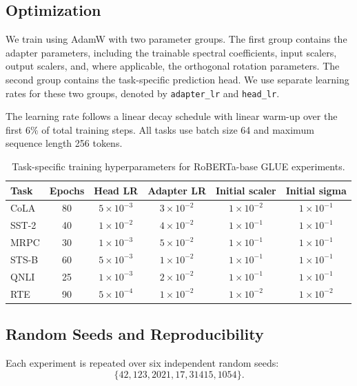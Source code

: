 \documentclass{article}
\begin{document}
\subsection{Optimization}

We train using AdamW with two parameter groups. The first group contains the adapter parameters, including the trainable spectral coefficients, input scalers, output scalers, and, where applicable, the orthogonal rotation parameters. The second group contains the task-specific prediction head. We use separate learning rates for these two groups, denoted by \texttt{adapter\_lr} and \texttt{head\_lr}.

The learning rate follows a linear decay schedule with linear warm-up over the first $6\%$ of total training steps. All tasks use batch size 64 and maximum sequence length 256 tokens.

\begin{table}[h]
\centering
\caption{Task-specific training hyperparameters for RoBERTa-base GLUE experiments.}
\label{tab:task_hyperparams}
\begin{tabular}{lccccc}
\toprule
Task & Epochs & Head LR & Adapter LR & Initial scaler & Initial sigma \\
\midrule
CoLA  & 80 & $5 \times 10^{-3}$ & $3 \times 10^{-2}$ & $1 \times 10^{-2}$ & $1 \times 10^{-1}$ \\
SST-2 & 40 & $1 \times 10^{-2}$ & $4 \times 10^{-2}$ & $1 \times 10^{-1}$ & $1 \times 10^{-1}$ \\
MRPC  & 30 & $1 \times 10^{-3}$ & $5 \times 10^{-2}$ & $1 \times 10^{-1}$ & $1 \times 10^{-1}$ \\
STS-B & 60 & $5 \times 10^{-3}$ & $1 \times 10^{-2}$ & $1 \times 10^{-1}$ & $1 \times 10^{-1}$ \\
QNLI  & 25 & $1 \times 10^{-3}$ & $2 \times 10^{-2}$ & $1 \times 10^{-1}$ & $1 \times 10^{-1}$ \\
RTE   & 90 & $5 \times 10^{-4}$ & $1 \times 10^{-2}$ & $1 \times 10^{-2}$ & $1 \times 10^{-2}$ \\
\bottomrule
\end{tabular}
\end{table}


\subsection{Random Seeds and Reproducibility}

Each experiment is repeated over six independent random seeds:
\[
\{42, 123, 2021, 17, 31415, 1054\}.
\]
\end{document}
